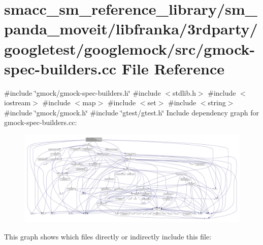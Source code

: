 \hypertarget{gmock-spec-builders_8cc}{}\section{smacc\+\_\+sm\+\_\+reference\+\_\+library/sm\+\_\+panda\+\_\+moveit/libfranka/3rdparty/googletest/googlemock/src/gmock-\/spec-\/builders.cc File Reference}
\label{gmock-spec-builders_8cc}
{\ttfamily \#include \char`\"{}gmock/gmock-\/spec-\/builders.\+h\char`\"{}}\newline
{\ttfamily \#include $<$stdlib.\+h$>$}\newline
{\ttfamily \#include $<$iostream$>$}\newline
{\ttfamily \#include $<$map$>$}\newline
{\ttfamily \#include $<$set$>$}\newline
{\ttfamily \#include $<$string$>$}\newline
{\ttfamily \#include \char`\"{}gmock/gmock.\+h\char`\"{}}\newline
{\ttfamily \#include \char`\"{}gtest/gtest.\+h\char`\"{}}\newline
Include dependency graph for gmock-\/spec-\/builders.cc\+:
\nopagebreak
\begin{figure}[H]
\begin{center}
\leavevmode
\includegraphics[width=350pt]{gmock-spec-builders_8cc__incl}
\end{center}
\end{figure}
This graph shows which files directly or indirectly include this file\+:
\nopagebreak
